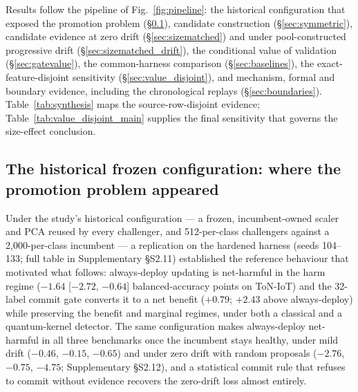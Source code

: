 \documentclass[a4paper,fleqn]{cas-sc}
\begin{document}
Results follow the pipeline of Fig.~\ref{fig:pipeline}: the historical configuration that exposed the promotion problem (\S\ref{sec:historical}), candidate construction (\S\ref{sec:symmetric}), candidate evidence at zero drift (\S\ref{sec:sizematched}) and under pool-constructed progressive drift (\S\ref{sec:sizematched_drift}), the conditional value of validation (\S\ref{sec:gatevalue}), the common-harness comparison (\S\ref{sec:baselines}), the exact-feature-disjoint sensitivity (\S\ref{sec:value_disjoint}), and mechanism, formal and boundary evidence, including the chronological replays (\S\ref{sec:boundaries}). Table~\ref{tab:synthesis} maps the source-row-disjoint evidence; Table~\ref{tab:value_disjoint_main} supplies the final sensitivity that governs the size-effect conclusion.



\subsection{The historical frozen configuration: where the promotion problem appeared}
\label{sec:historical}

Under the study's historical configuration --- a frozen, incumbent-owned scaler and PCA reused by every challenger, and 512-per-class challengers against a 2{,}000-per-class incumbent --- a replication on the hardened harness (seeds 104--133; full table in Supplementary \S S2.11) established the reference behaviour that motivated what follows: always-deploy updating is net-harmful in the harm regime ($-1.64$ [$-2.72$, $-0.64$] balanced-accuracy points on ToN-IoT) and the 32-label commit gate converts it to a net benefit ($+0.79$; $+2.43$ above always-deploy) while preserving the benefit and marginal regimes, under both a classical and a quantum-kernel detector. The same configuration makes always-deploy net-harmful in all three benchmarks once the incumbent stays healthy, under mild drift ($-0.46$, $-0.15$, $-0.65$) and under zero drift with random proposals ($-2.76$, $-0.75$, $-4.75$; Supplementary \S S2.12), and a statistical commit rule that refuses to commit without evidence recovers the zero-drift loss almost entirely.
\end{document}
